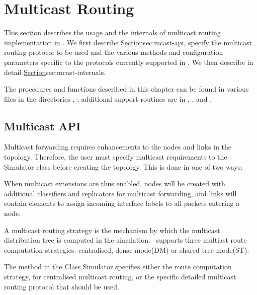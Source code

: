 \chapter{Multicast Routing}
\label{chap:multicast}

This section describes the usage and the internals of multicast
routing implementation in \ns.
We first describe 
\href{the user interface to enable multicast routing}{Section}{sec:mcast-api},
specify the multicast routing protocol to be used and the
various methods and configuration parameters specific to the
protocols currently supported in \ns.
We then describe in detail 
\href{the internals and the architecture of the
multicast routing implementation in \ns}{Section}{sec:mcast-internals}.

The procedures and functions described in this chapter can be found in
various files in the directories , ;
additional support routines
are in ,
, and .

\section{Multicast API}
\label{sec:mcast-api}

Multicast forwarding requires enhancements
to the nodes and links in the topology.
Therefore, the user must specify multicast requirements
to the Simulator class before creating the topology.
This is done in one of two ways:
When multicast extensions are thus enabled, nodes will be created with
additional classifiers and replicators for multicast forwarding, and
links will contain elements to assign incoming interface labels to all
packets entering a node.

A multicast routing strategy is the mechanism by which
the multicast distribution tree is computed in the simulation.
\ns\ supports three multiast route computation strategies:
        centralised, dense mode(DM) or shared tree mode(ST).

The method  in the Class Simulator specifies either
the route computation strategy, for centralised multicast routing, or
the specific detailed multicast routing protocol that should be used.

